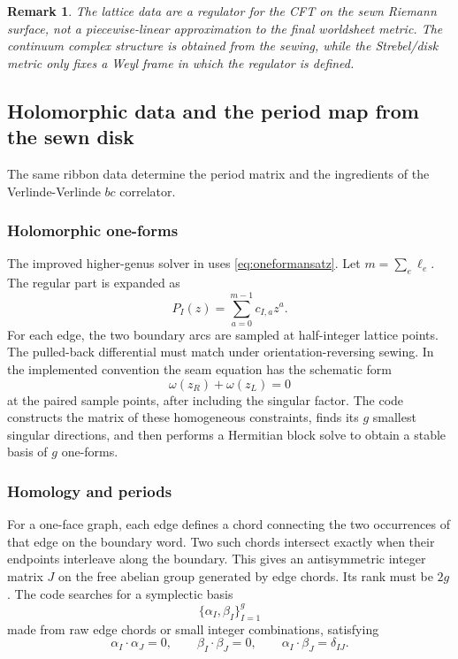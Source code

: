 \documentclass[11pt]{article}
\numberwithin{equation}{section}
\newtheorem{remark}{Remark}
\begin{document}
\begin{remark}
The lattice data are a regulator for the CFT on the sewn Riemann surface, not a
piecewise-linear approximation to the final worldsheet metric.  The continuum
complex structure is obtained from the sewing, while the Strebel/disk metric
only fixes a Weyl frame in which the regulator is defined.
\end{remark}

\subsection{Holomorphic data and the period map from the sewn disk}

The same ribbon data determine the period matrix and the ingredients of the
Verlinde-Verlinde \(bc\) correlator.

\subsubsection{Holomorphic one-forms}

The improved higher-genus solver in  uses
\eqref{eq:oneformansatz}.  Let \(m=\sum_e\ell_e\).  The regular part is
expanded as
\begin{equation}
        P_I(z)=\sum_{a=0}^{m-1}c_{I,a}z^a.
\end{equation}
For each edge, the two boundary arcs are sampled at half-integer lattice
points.  The pulled-back differential must match under orientation-reversing
sewing.  In the implemented convention the seam equation has the schematic
form
\begin{equation}
        \omega(z_R)+\omega(z_L)=0
        \label{eq:seamconstraint}
\end{equation}
at the paired sample points, after including the singular factor.  The code
constructs the matrix of these homogeneous constraints, finds its \(g\)
smallest singular directions, and then performs a Hermitian block solve to
obtain a stable basis of \(g\) one-forms.

\subsubsection{Homology and periods}

For a one-face graph, each edge defines a chord connecting the two occurrences
of that edge on the boundary word.  Two such chords intersect exactly when
their endpoints interleave along the boundary.  This gives an antisymmetric
integer matrix \(J\) on the free abelian group generated by edge chords.  Its
rank must be \(2g\).  The code searches for a symplectic basis
\[
        \{\alpha_I,\beta_I\}_{I=1}^g
\]
made from raw edge chords or small integer combinations, satisfying
\begin{equation}
        \alpha_I\cdot\alpha_J=0,\qquad
        \beta_I\cdot\beta_J=0,\qquad
        \alpha_I\cdot\beta_J=\delta_{IJ}.
\end{equation}
\end{document}
